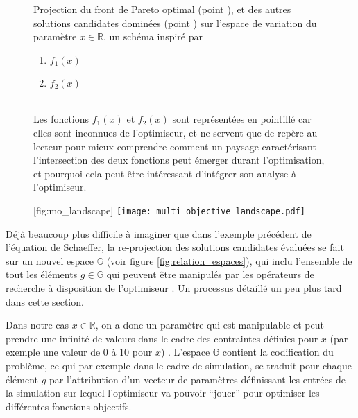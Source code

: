 \begin{figure}[!htbp]
	\begin{sidecaption}[fortoc]{Projection du front de Pareto optimal (point ), et des autres solutions candidates dominées (point ) sur l'espace de variation du paramètre $x \in \mathbb{R}$, un schéma inspiré par \textcite[67]{Weise2011}
	\parbox{\marginparwidth}{
	\begin{enumerate}[label={},labelindent=0pt,leftmargin=*]
	      \item {} $f_{1}(x)$
	      \item {} $f_{2}(x)$
	\end{enumerate}}\\
	Les fonctions $f_{1}(x)$ et $f_{2}(x)$ sont représentées en pointillé car elles sont inconnues de l'optimiseur, et ne servent que de repère au lecteur pour mieux comprendre comment un paysage caractérisant l'intersection des deux fonctions peut émerger durant l'optimisation, et pourquoi cela peut être intéressant d'intégrer son analyse à l'optimiseur.}[fig:mo_landscape]
	 \centering
	 	\texttt{[image: multi\_objective\_landscape.pdf]}
	\end{sidecaption}
\end{figure}


Déjà beaucoup plus difficile à imaginer que dans l'exemple précédent de l'équation de Schaeffer, la re-projection des solutions candidates évaluées se fait sur un nouvel espace $\mathbb{G}$ (voir figure \ref{fig:relation_espaces}), qui inclu l'ensemble de tout les éléments $g \in \mathbb{G}$ qui peuvent être manipulés par les opérateurs de recherche à disposition de l'optimiseur \autocite[82]{Weise2011}. Un processus détaillé un peu plus tard dans cette section.

Dans notre cas $x \in \mathbb{R}$, on a donc un paramètre qui est manipulable et peut prendre une infinité de valeurs dans le cadre des contraintes définies pour $x$ (par exemple une valeur de 0 à 10 pour $x$) . L'espace $\mathbb{G}$ contient la codification du problème, ce qui par exemple dans le cadre de simulation, se traduit pour chaque élément $g$ par l'attribution d'un vecteur de paramètres définissant les entrées de la simulation sur lequel l'optimiseur va pouvoir \enquote{jouer} pour optimiser les différentes fonctions objectifs.

